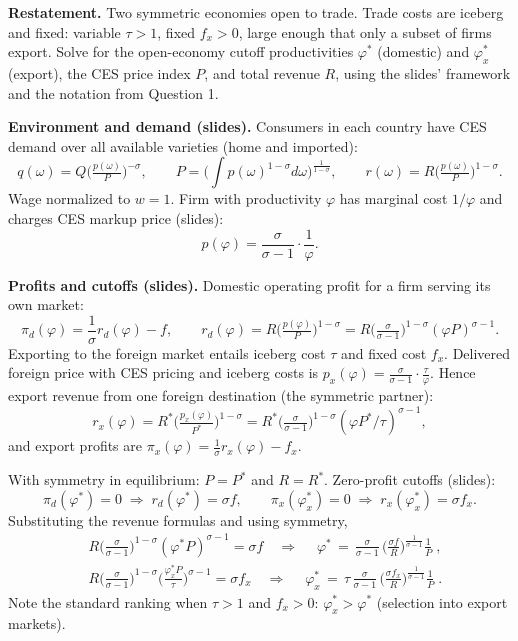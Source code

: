 \begin{solution}
	\textbf{Restatement.} Two symmetric economies open to trade. Trade costs are iceberg and fixed: variable $\tau>1$, fixed $f_x>0$, large enough that only a subset of firms export. Solve for the open-economy cutoff productivities $\varphi^*$ (domestic) and $\varphi_x^*$ (export), the CES price index $P$, and total revenue $R$, using the slides’ framework and the notation from Question 1.

\bigskip
	\textbf{Environment and demand (slides).}
Consumers in each country have CES demand over all available varieties (home and imported):
\[
q(\omega) = Q \Big(\tfrac{p(\omega)}{P}\Big)^{-\sigma},\qquad 
P = \Big( \int p(\omega)^{1-\sigma} d\omega \Big)^{\tfrac{1}{1-\sigma}},\qquad r(\omega)=R\Big(\tfrac{p(\omega)}{P}\Big)^{1-\sigma}.
\]
Wage normalized to $w=1$. Firm with productivity $\varphi$ has marginal cost $1/\varphi$ and charges CES markup price (slides):
\[
p(\varphi) = \frac{\sigma}{\sigma-1}\cdot\frac{1}{\varphi}.
\]

\bigskip
	\textbf{Profits and cutoffs (slides).}
Domestic operating profit for a firm serving its own market:
\[
\pi_d(\varphi) = \frac{1}{\sigma} r_d(\varphi) - f,\qquad r_d(\varphi)= R\Big(\tfrac{p(\varphi)}{P}\Big)^{1-\sigma} 
 = R\Big(\tfrac{\sigma}{\sigma-1}\Big)^{1-\sigma} (\varphi P)^{\sigma-1}.
\]
Exporting to the foreign market entails iceberg cost $\tau$ and fixed cost $f_x$. Delivered foreign price with CES pricing and iceberg costs is $p_x(\varphi)=\tfrac{\sigma}{\sigma-1}\cdot\tfrac{\tau}{\varphi}$. Hence export revenue from one foreign destination (the symmetric partner):
\[
r_x(\varphi) = R^* \Big(\tfrac{p_x(\varphi)}{P^*}\Big)^{1-\sigma} = R^*\Big(\tfrac{\sigma}{\sigma-1}\Big)^{1-\sigma} (\varphi P^*/\tau)^{\sigma-1},
\]
and export profits are $\pi_x(\varphi)=\tfrac{1}{\sigma} r_x(\varphi)-f_x$.

With symmetry in equilibrium: $P=P^*$ and $R=R^*$. Zero-profit cutoffs (slides):
\[
\pi_d(\varphi^*)=0 \;\Rightarrow\; r_d(\varphi^*)=\sigma f,
\qquad
\pi_x(\varphi_x^*)=0 \;\Rightarrow\; r_x(\varphi_x^*)=\sigma f_x.
\]
Substituting the revenue formulas and using symmetry,
\begin{align*}
&R\Big(\tfrac{\sigma}{\sigma-1}\Big)^{1-\sigma} (\varphi^* P)^{\sigma-1} = \sigma f
\quad\Rightarrow\quad
\boxed{\;\displaystyle \varphi^* \,=\, \frac{\sigma}{\sigma-1}\,\Big(\frac{\sigma f}{R}\Big)^{\!\tfrac{1}{\sigma-1}} \frac{1}{P} \;}, \\
&R\Big(\tfrac{\sigma}{\sigma-1}\Big)^{1-\sigma} \Big(\frac{\varphi_x^* P}{\tau}\Big)^{\sigma-1} = \sigma f_x
\quad\Rightarrow\quad
\boxed{\;\displaystyle \varphi_x^* \,=\, \tau\, \frac{\sigma}{\sigma-1}\,\Big(\frac{\sigma f_x}{R}\Big)^{\!\tfrac{1}{\sigma-1}} \frac{1}{P} \; }.
\end{align*}
Note the standard ranking when $\tau>1$ and $f_x>0$: $\varphi_x^*>\varphi^*$ (selection into export markets).


\end{solution}
